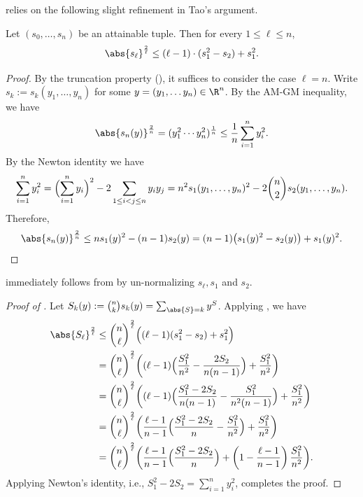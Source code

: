 relies on the following slight refinement in Tao's argument.

\begin{lemma} \label{lemma:tao}
  Let $(s_0, \ldots, s_n)$ be an attainable tuple.
  Then for every $1 \le \ell \le n$,
  \[
    \abs{s_\ell}^{\frac{2}{\ell}}
    \le (\ell-1) \cdot (s_1^2 - s_2) + s_1^2 .
  \]
\end{lemma}

\begin{proof}
  By the truncation property (), it suffices to consider the case $\ell=n$.
  Write $s_k := s_k(y_1, \ldots, y_n)$ for some $y = (y_1, \ldots y_n) \in \R^n$.
  By the AM-GM inequality, we have
  \[
    \abs{s_n(y)}^{\frac{2}{n}}
    = (y_1^2 \cdots y_n^2)^{\frac{1}{n}}
    \le \frac{1}{n} \sum_{i=1}^n y_i^2 .
  \]
  By the Newton identity we have
  \begin{align*}
    \sum_{i=1}^n y_i^2
    = \Bigl(\sum_{i=1}^n y_i \Bigr)^2 - 2 \sum_{1 \le i<j \le n} y_i y_j
    = n^2 s_1(y_1, \ldots, y_n)^2 - 2 \binom{n}{2} s_2(y_1, \ldots, y_n) .
  \end{align*}
  Therefore,
  \[
    \abs{s_n(y)}^{\frac{2}{n}}
    \le n s_1(y)^2 - (n-1)s_2(y)
    = (n-1) \bigl( s_1(y)^2 - s_2(y) \bigr) + s_1(y)^2 . \qedhere
  \]
\end{proof}

 immediately follows from  by un-normalizing $s_\ell, s_1$ and $s_2$.

\begin{proof}[Proof of ] 
  Let $S_k(y) := \binom{n}{k} s_k(y) = \sum_{\abs{S}=k} y^S$.
  Applying , we have
  \begin{align*}
      \abs{S_\ell}^{\frac{2}{\ell}}
      &\le \binom{n}{\ell}^{\frac{2}{\ell}} \Bigl( (\ell-1) (s_1^2 - s_2) + s_1^2 \Bigr) \\
      &= \binom{n}{\ell}^{\frac{2}{\ell}} \biggl( (\ell-1) \Bigl( \frac{S_1^2}{n^2} - \frac{2S_2}{n(n-1)} \Bigr) + \frac{S_1^2}{n^2} \biggr) \\
      &= \binom{n}{\ell}^{\frac{2}{\ell}} \biggl( (\ell-1) \Bigl( \frac{S_1^2 - 2S_2}{n(n-1)} - \frac{S_1^2}{n^2(n-1)} \Bigr) + \frac{S_1^2}{n^2} \biggr) \\
      &= \binom{n}{\ell}^{\frac{2}{\ell}} \biggl( \frac{\ell-1}{n-1} \Bigl( \frac{S_1^2 - 2S_2}{n} - \frac{S_1^2}{n^2} \Bigr) + \frac{S_1^2}{n^2} \biggr) \\
      &= \binom{n}{\ell}^{\frac{2}{\ell}} \biggl( \frac{\ell-1}{n-1} \Bigl( \frac{S_1^2 - 2S_2}{n} \Bigr) + \left(1 - \frac{\ell-1}{n-1} \right) \frac{S_1^2}{n^2} \biggr) .
  \end{align*}
  Applying Newton's identity, i.e., $S_1^2 - 2S_2 = \sum_{i=1}^n y_i^2$, completes the proof.
\end{proof}

